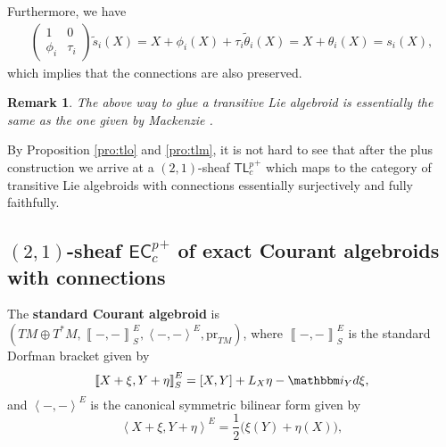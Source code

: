 \documentclass[letterpaper,10pt, oneside]{article} %
\newtheorem{rmk}[thm]{Remark}
\newcommand{\tlp}{{\mathsf{TL}^{p}_{c}}} %
\newcommand{\ecalgdpp}{{\mathsf{EC}^{p}_{c}}^+} %
\newcommand{\ii}{\mathbbm i}
\def\qed{\hfill ~\vrule height6pt width6pt depth0pt}
\newcommand{\half}{\frac{1}{2}}
\newcommand{\pair}[1]{\left\langle #1\right\rangle}
\newcommand{\Courant}[1]{\left\llbracket  #1\right\rrbracket }
\newcommand{\pr}{\mathrm{pr}}
\begin{document}
Furthermore, we have
\begin{eqnarray*}
   \left(\begin{array}{cc}
1&0\\
\phi_{i}&\tau_{i}
\end{array} \right)\widetilde{s}_i(X)=X+\phi_i(X)+\tau_i\widetilde{\theta}_i(X)=X+\theta_i(X)=s_i(X),
\end{eqnarray*}
which implies that the connections are also preserved.\qed

\begin{rmk}
 The above way to glue a transitive Lie algebroid is essentially the same as the one given by Mackenzie \cite{MK2}. %
\end{rmk}

By Proposition \ref{pro:tlo} and \ref{pro:tlm},  it is not hard to see that after the plus construction we arrive at a $(2,1)$-sheaf ${\tlp}^+$ which maps to the category of transitive Lie algebroids with connections essentially surjectively and fully faithfully.






\subsection{$(2,1)$-sheaf ${\ecalgdpp}$
 of exact Courant algebroids with connections}\label{app:ec}

The {\bf standard Courant algebroid} is  $(TM\oplus T^*M,\Courant{-,-}^E_S,\pair{-,-}^E,\pr_{TM})$, where  $\Courant{-,-}^E_S$ is the standard Dorfman bracket given by
\begin{equation}\label{eq:standardb}
  \Courant{X+\xi,Y+\eta}^E_S=[X,Y]+L_X\eta-\ii_Yd\xi,
\end{equation}
and $\pair{-,-}^E$ is the canonical symmetric bilinear form given by
  \begin{equation}\label{eq:standardpair}
  \pair{X+\xi,Y+\eta}^E=\half\big( \xi(Y)+\eta(X)\big),
\end{equation}
\end{document}
